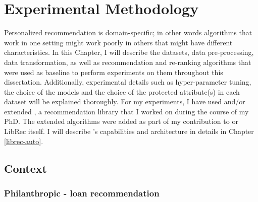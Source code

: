 \chapter{Experimental Methodology}
\label{ch:methodology}

Personalized recommendation is domain-specific; in other words algorithms that work in one setting might work poorly in others that might have different characteristics. \todo{\cite{}}
In this Chapter, I will describe the datasets, data pre-processing, data transformation, as well as recommendation and re-ranking algorithms that were used as baseline to perform experiments on them throughout this dissertation. 
Additionally, experimental details such as hyper-parameter tuning, the choice of the models and the choice of the protected attribute(s) in each dataset will be explained thoroughly. For my experiments, I have used and/or extended \libauto{}, a recommendation library that I worked on during the course of my PhD. The extended algorithms were added as part of my contribution to \libauto{} or LibRec itself. I will describe \libauto{}'s capabilities and architecture in details in Chapter \ref{librec-auto}.


\section{Context}
    \subsection{Philanthropic - loan recommendation}

    
